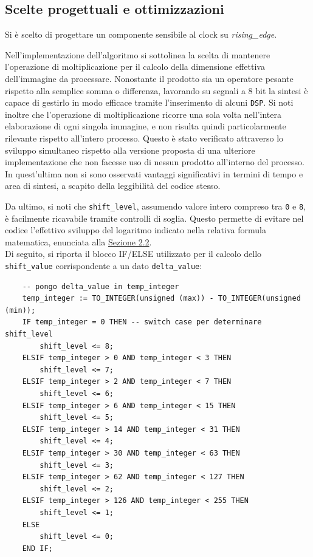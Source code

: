 \documentclass{article}
\begin{document}
\subsection{Scelte progettuali e ottimizzazioni} %
Si è scelto di progettare un componente sensibile al clock su \emph{rising\_edge}.\par
Nell’implementazione dell’algoritmo si sottolinea la scelta di mantenere l’operazione di moltiplicazione per il calcolo della dimensione effettiva dell’immagine da processare. Nonostante il prodotto sia un operatore pesante rispetto alla semplice somma o differenza, lavorando su segnali a 8 bit la sintesi è capace di gestirlo in modo efficace tramite l’inserimento di alcuni \texttt{DSP}\footnotemark.
Si noti inoltre che l’operazione di moltiplicazione ricorre una sola volta nell’intera elaborazione di ogni singola immagine, e non risulta quindi particolarmente rilevante rispetto all’intero processo. Questo è stato verificato attraverso lo sviluppo simultaneo rispetto alla versione proposta di una ulteriore implementazione che non facesse uso di nessun prodotto all’interno del processo. In quest’ultima non si sono osservati vantaggi significativi in termini di tempo e area di sintesi, a scapito della leggibilità del codice stesso.\par
Da ultimo, si noti che \texttt{shift\_level}, assumendo valore intero compreso tra \texttt{0} e \texttt{8}, è facilmente ricavabile tramite controlli di soglia. Questo permette di evitare nel codice l’effettivo sviluppo del logaritmo indicato nella relativa formula matematica, enunciata alla \hyperref[sec:appr]{Sezione 2.2}.\\
Di seguito, si riporta il blocco IF/ELSE utilizzato per il calcolo dello \texttt{shift\_value} corrispondente a un dato \texttt{delta\_value}:
\vspace{-.15cm}

\begin{verbatim}
    -- pongo delta_value in temp_integer
    temp_integer := TO_INTEGER(unsigned (max)) - TO_INTEGER(unsigned (min)); 
    IF temp_integer = 0 THEN -- switch case per determinare shift_level
        shift_level <= 8;
    ELSIF temp_integer > 0 AND temp_integer < 3 THEN
        shift_level <= 7;
    ELSIF temp_integer > 2 AND temp_integer < 7 THEN
        shift_level <= 6;
    ELSIF temp_integer > 6 AND temp_integer < 15 THEN
        shift_level <= 5;
    ELSIF temp_integer > 14 AND temp_integer < 31 THEN
        shift_level <= 4;
    ELSIF temp_integer > 30 AND temp_integer < 63 THEN
        shift_level <= 3;
    ELSIF temp_integer > 62 AND temp_integer < 127 THEN
        shift_level <= 2;
    ELSIF temp_integer > 126 AND temp_integer < 255 THEN
        shift_level <= 1;
    ELSE
        shift_level <= 0;
    END IF;
\end{verbatim}
\end{document}
